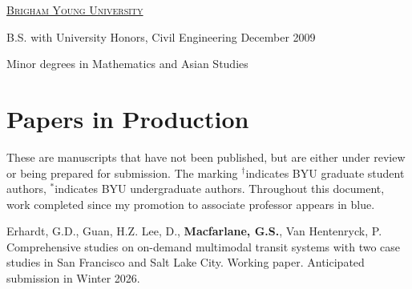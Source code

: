 \documentclass[margin,line]{res}
\newcommand{\acc}{\scshape }
\newif\ifdetail{}
\newenvironment{list1}{
  \begin{list}{\ding{113}}{%
      \setlength{\itemsep}{0in}
      \setlength{\parsep}{0in} \setlength{\parskip}{0in}
      \setlength{\topsep}{0in} \setlength{\partopsep}{0in}
      \setlength{\leftmargin}{0.17in}}}{\end{list}}
\newenvironment{list2}{
  \begin{list}{$\bullet$}{%
      \setlength{\itemsep}{0in}
      \setlength{\parsep}{0in} \setlength{\parskip}{0in}
      \setlength{\topsep}{0in} \setlength{\partopsep}{0in}
      \setlength{\leftmargin}{0.2in}}}{\end{list}}
\newcounter{enuminitialize}
\newenvironment{myenum}[1][]
{%
 \setcounter{enuminitialize}{#1}
 \addtocounter{enuminitialize}{2}
 \begin{enumerate}[left= 4pt, itemsep=8pt, start=\value{enuminitialize}, label=\arabic*\addtocounter{enumi}{-2}]
}
{%
 \end{enumerate}
}
\begin{document}
\begin{resume}
\href{http://www.byu.edu}{\acc Brigham Young University}
\\
\vspace*{-.1in}
\begin{list1} 
  \item[] B.S. with University Honors, Civil Engineering \hfill{December 2009}
  \item[] Minor degrees in Mathematics and Asian Studies
\end{list1}




\ifdetail 
\section{Papers in Production}
These are manuscripts that have not been published, but are either under review or being prepared for submission.
The marking $^\dagger$indicates BYU graduate student authors, $^*$indicates BYU undergraduate authors.
{\color{NavyBlue} Throughout this document, work completed since my promotion to associate professor appears in blue.}

\vspace{.3cm}
\begin{myenum}[7]
  {\color{NavyBlue} 
  \item Erhardt, G.D., Guan, H.Z. Lee, D., \textbf{Macfarlane, G.S.}, Van Hentenryck,
  P. Comprehensive studies on on-demand multimodal transit systems with
  two case studies in San Francisco and Salt Lake City. Working paper. Anticipated submission in Winter 2026.

}
\end{myenum}
\end{resume}
\end{document}
